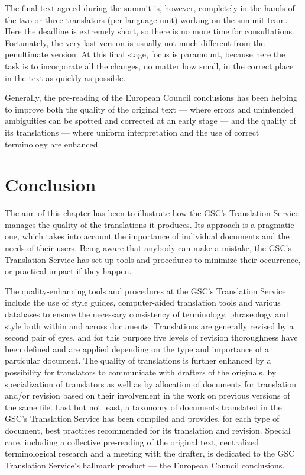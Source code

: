 \documentclass[output=paper]{langsci/langscibook}
\begin{document}
The final text agreed during the summit is, however, completely in the hands of the two or three translators (per language unit) working on the summit team. Here the deadline is extremely short, so there is no more time for consultations. Fortunately, the very last version is usually not much different from the penultimate version. At this final stage, focus is paramount, because here the task is to incorporate all the changes, no matter how small, in the correct place in the text as quickly as possible.

Generally, the pre-reading of the European Council conclusions has been helping to improve both the quality of the original text — where errors and unintended ambiguities can be spotted and corrected at an early stage — and the quality of its translations — where uniform interpretation and the use of correct terminology are enhanced. 

\section{Conclusion}\label{sec:hanzl:hanzl:7}

The aim of this chapter has been to illustrate how the GSC’s Translation Service manages the quality of the translations it produces. Its approach is a pragmatic one, which takes into account the importance of individual documents and the needs of their users. Being aware that anybody can make a mistake, the GSC’s Translation Service has set up tools and procedures to minimize their occurrence, or practical impact if they happen.

The quality-enhancing tools and procedures at the GSC’s Translation Service include the use of style guides, computer-aided translation tools and various databases to ensure the necessary consistency of terminology, phraseology and style both within and across documents. Translations are generally revised by a second pair of eyes, and for this purpose five levels of revision thoroughness have been defined and are applied depending on the type and importance of a particular document. The quality of translations is further enhanced by a possibility for translators to communicate with drafters of the originals, by specialization of translators as well as by allocation of documents for translation and/or revision based on their involvement in the work on previous versions of the same file. Last but not least, a taxonomy of documents translated in the GSC’s Translation Service has been compiled and provides, for each type of document, best practices recommended for its translation and revision. Special care, including a collective pre-reading of the original text, centralized terminological research and a meeting with the drafter, is dedicated to the GSC Translation Service’s hallmark product — the European Council conclusions.
\end{document}
